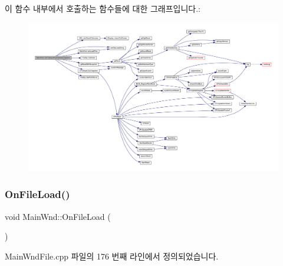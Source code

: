이 함수 내부에서 호출하는 함수들에 대한 그래프입니다.\+:
\nopagebreak
\begin{figure}[H]
\begin{center}
\leavevmode
\includegraphics[width=350pt]{class_main_wnd_a1ba9d10fce306e309613d8e06097219c_cgraph}
\end{center}
\end{figure}
\mbox{\label{class_main_wnd_a50801b3ffe4aa323fdd654dc56e71d32}} 
\subsubsection{\texorpdfstring{On\+File\+Load()}{OnFileLoad()}}
{\footnotesize\ttfamily void Main\+Wnd\+::\+On\+File\+Load (\begin{DoxyParamCaption}{ }\end{DoxyParamCaption})\hspace{0.3cm}{\ttfamily [protected]}}



Main\+Wnd\+File.\+cpp 파일의 176 번째 라인에서 정의되었습니다.


